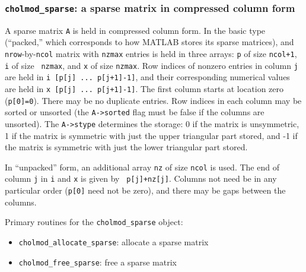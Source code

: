 \documentclass[11pt]{article}
\begin{document}
\subsubsection{{\tt cholmod\_sparse}: a sparse matrix in compressed
column form}

    A sparse matrix {\tt A} is held in compressed column form.  In the basic
    type (``packed,'' which corresponds to how MATLAB stores its sparse
    matrices), and {\tt nrow}-by-{\tt ncol} matrix with {\tt nzmax} entries is
    held in three arrays: {\tt p} of size {\tt ncol+1}, {\tt i} of size {\tt
    nzmax}, and {\tt x} of size {\tt nzmax}.  Row indices of nonzero entries in
    column {\tt j} are held in {\tt i [p[j] ... p[j+1]-1]}, and their
    corresponding numerical values are held in {\tt x [p[j] ... p[j+1]-1]}.
    The first column starts at location zero ({\tt p[0]=0}).  There may be no
    duplicate entries.  Row indices in each column may be sorted or unsorted
    (the {\tt A->sorted} flag must be false if the columns are unsorted).  The
    {\tt A->stype} determines the storage: 0 if the matrix is unsymmetric,
    1 if the matrix is symmetric with just the upper triangular part stored,
    and -1 if the matrix is symmetric with just the lower triangular part
    stored.

    In ``unpacked'' form, an additional array {\tt nz} of size {\tt ncol} is
    used.  The end of column {\tt j} in {\tt i} and {\tt x} is given by {\tt
    p[j]+nz[j]}.  Columns not need be in any particular order ({\tt p[0]} need
    not be zero), and there may be gaps between the columns.

\vspace{0.1in}
\noindent Primary routines for the {\tt cholmod\_sparse} object:
    \begin{itemize}
    \item {\tt cholmod\_allocate\_sparse}: allocate a sparse matrix
    \item {\tt cholmod\_free\_sparse}: free a sparse matrix
    \end{itemize}
\end{document}

